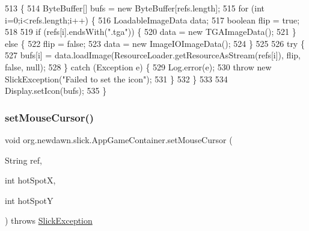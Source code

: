 \begin{DoxyCode}
513                                                               \{
514         ByteBuffer[] bufs = \textcolor{keyword}{new} ByteBuffer[refs.length];
515         \textcolor{keywordflow}{for} (\textcolor{keywordtype}{int} i=0;i<refs.length;i++) \{
516             LoadableImageData data;
517             \textcolor{keywordtype}{boolean} flip = \textcolor{keyword}{true};
518             
519             \textcolor{keywordflow}{if} (refs[i].endsWith(\textcolor{stringliteral}{".tga"})) \{
520                 data = \textcolor{keyword}{new} TGAImageData();
521             \} \textcolor{keywordflow}{else} \{
522                 flip = \textcolor{keyword}{false};
523                 data = \textcolor{keyword}{new} ImageIOImageData();
524             \}
525             
526             \textcolor{keywordflow}{try} \{
527                 bufs[i] = data.loadImage(ResourceLoader.getResourceAsStream(refs[i]), flip, \textcolor{keyword}{false}, null);
528             \} \textcolor{keywordflow}{catch} (Exception e) \{
529                 Log.error(e);
530                 \textcolor{keywordflow}{throw} \textcolor{keyword}{new} SlickException(\textcolor{stringliteral}{"Failed to set the icon"});
531             \}
532         \}
533         
534         Display.setIcon(bufs);
535     \}
\end{DoxyCode}
\mbox{\label{classorg_1_1newdawn_1_1slick_1_1_app_game_container_ae67b08cdfec1664e0cf2882064cfb3c0}} 
\subsubsection{\texorpdfstring{set\+Mouse\+Cursor()}{setMouseCursor()}\hspace{0.1cm}{\footnotesize\ttfamily [1/4]}}
{\footnotesize\ttfamily void org.\+newdawn.\+slick.\+App\+Game\+Container.\+set\+Mouse\+Cursor (\begin{DoxyParamCaption}\item[{String}]{ref,  }\item[{int}]{hot\+SpotX,  }\item[{int}]{hot\+SpotY }\end{DoxyParamCaption}) throws \mbox{\hyperlink{classorg_1_1newdawn_1_1slick_1_1_slick_exception}{Slick\+Exception}}\hspace{0.3cm}{\ttfamily [inline]}}

